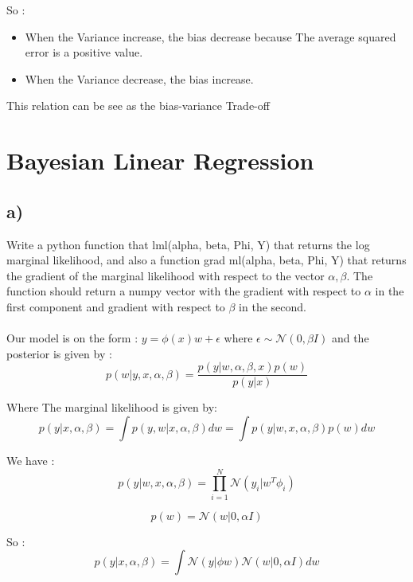 \documentclass[12pt,twoside]{article}
\begin{document}
So :
\begin{itemize}
	\item When the Variance increase, the bias decrease because The average squared error is a positive value.
	\item When the Variance decrease, the bias increase.
\end{itemize}

This relation can be see as the bias-variance Trade-off

\section{Bayesian Linear Regression}
\subsection*{a)} Write a python function that lml(alpha, beta, Phi, Y) that returns the log marginal likelihood, and also a function grad ml(alpha, beta, Phi, Y) that returns the gradient of the marginal likelihood with respect to the vector $\alpha, \beta$. The function should return a numpy vector with the gradient with respect to $\alpha$ in the first component and gradient with respect to $\beta$ in the second. \\ \\

Our model is on the form : $y = \phi(x)w + \epsilon$ where $\epsilon \sim \mathcal{N}(0, \beta I)$ and the posterior is given by :
\begin{equation*}
p(w|y,x,\alpha, \beta) = \frac{p(y|w,\alpha,\beta,x)p(w)}{p(y|x)}
\end{equation*}

Where The marginal likelihood is given by:
\begin{equation*}
p(y|x,\alpha, \beta) = \int p(y, w|x, \alpha, \beta)dw = \int p(y| w,x,\alpha, \beta) p(w) dw
\end{equation*}

We have :
\begin{equation*}
p(y| w,x,\alpha, \beta) = \prod_{i=1}^{N} \mathcal{N}(y_i|w^T\phi_i)
\end{equation*}

\begin{equation*}
p(w) = \mathcal{N}(w|0,\alpha I)
\end{equation*}

So :
\begin{equation*}
p(y|x,\alpha, \beta) =\int \mathcal{N}(y|\phi w) \mathcal{N}(w|0,\alpha I) dw
\end{equation*}
\end{document}
